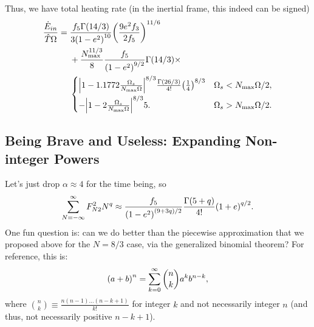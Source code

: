 \documentclass[11pt,
        usenames, %
        dvipsnames %
    ]{article}
\DeclarePairedDelimiter\abs{\lvert}{\rvert}
\DeclarePairedDelimiter\p{\lparen}{\rparen}
\begin{document}
Thus, we have total heating rate (in the inertial frame, this indeed can be
signed)
\begin{align}
    \frac{\dot{E}_{in}}{\hat{T}\Omega} ={}&
            \frac{f_5 \Gamma(14/3)}{3\p*{1 - e^2}^{10}}
                \p*{\frac{9e^2f_3}{2f_5}}^{11/6}\nonumber\\
        &+
            \frac{N_{\max}^{11/3}}{8}
            \frac{f_5}{\p*{1 - e^2}^{9/2}}
            \Gamma\p*{14/3} \times\nonumber\\
        &\begin{cases}
            \abs*{1 - 1.1772\frac{\Omega_s}{N_{\max}\Omega}}^{8/3}
                \frac{\Gamma\p*{26/3}}{4!}\p*{\frac{1}{4}}^{8/3}
                & \Omega_s < N_{\max}\Omega/2,\\[5pt]
            -\abs*{1 - 2\frac{\Omega_s}{N_{\max}\Omega}}^{8/3}5.
                & \Omega_s > N_{\max}\Omega/2.
        \end{cases}\label{eq:total_heating}
\end{align}

\subsection{Being Brave and Useless: Expanding Non-integer Powers}

Let's just drop $\alpha \approx 4$ for the time being, so
\begin{equation}
    \sum\limits_{N = -\infty}^\infty F_{N2}^2 N^q
        \approx \frac{f_5}{\p*{1 - e^2}^{(9 + 3q) / 2}}
            \frac{\Gamma\p*{5 + q}}{4!} \p*{1 + e}^{q/2}.
\end{equation}
One fun question is: can we do better than the piecewise approximation that we
proposed above for the $N = 8/3$ case, via the generalized binomial theorem? For
reference, this is:
\begin{equation}
    \p*{a + b}^n = \sum\limits_{k = 0}^\infty \binom{n}{k}a^kb^{n - k},
\end{equation}
where $\binom{n}{k} \equiv \frac{n(n - 1)\dots (n - k + 1)}{k!}$ for integer $k$
and not necessarily integer $n$ (and thus, not necessarily positive $n - k +
1$).
\end{document}
